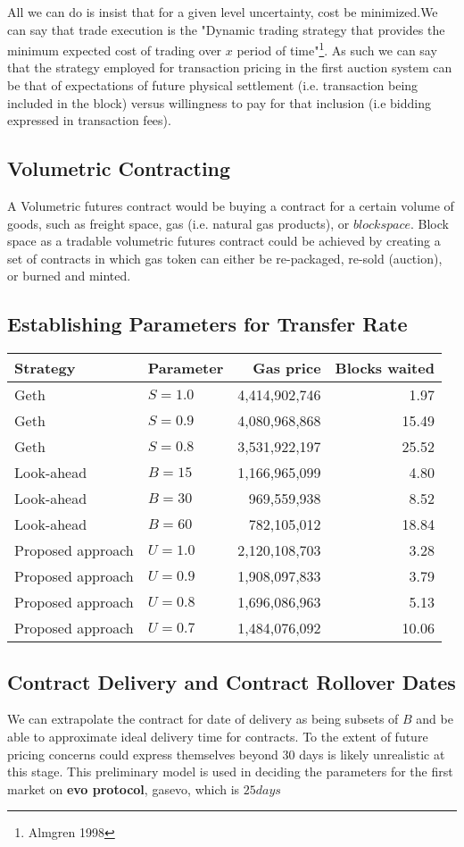 \newline

All we can do is insist that for a given level uncertainty, cost be minimized.We can say that trade execution is the "Dynamic trading
strategy that provides the minimum expected cost of trading over $x$
period of time"\footnote{Almgren 1998}. As such we can say that the
strategy employed for transaction pricing in the first auction system
can be that of expectations of future physical settlement (i.e.
transaction being included in the block) versus willingness to pay for
that inclusion (i.e bidding expressed in transaction fees).

\subsection{Volumetric Contracting}

A Volumetric futures contract would be buying a contract for a certain
volume of goods, such as freight space, gas (i.e. natural gas
products), or $block space$. Block space as a tradable volumetric
futures contract could be achieved by creating a set of contracts in
which gas token can either be re-packaged, re-sold (auction), or burned and minted.

\subsection{Establishing Parameters for Transfer Rate}

\begin{tabular}{llrr}
\hline Strategy & Parameter & Gas price & Blocks waited \\
\hline Geth & \(S =1.0\) & 4,414,902,746 & 1.97 \\
Geth & \(S =0.9\) & 4,080,968,868 & 15.49 \\
Geth & \(S =0.8\) & 3,531,922,197 & 25.52 \\
\hline Look-ahead & \(B =15\) & 1,166,965,099 & 4.80 \\
Look-ahead & \(B =30\) & 969,559,938 & 8.52 \\
Look-ahead & \(B =60\) & 782,105,012 & 18.84 \\
\hline Proposed approach & \(U =1.0\) & 2,120,108,703 & 3.28 \\
Proposed approach & \(U =0.9\) & 1,908,097,833 & 3.79 \\
Proposed approach & \(U =0.8\) & 1,696,086,963 & 5.13 \\
Proposed approach & \(U =0.7\) & 1,484,076,092 & 10.06
\end{tabular}
\newline
\subsection{Contract Delivery and Contract Rollover Dates}

We can extrapolate the contract for date of delivery as being subsets
of $B$ and be able to approximate ideal delivery time for
contracts. To the extent of future pricing concerns could express
themselves beyond 30 days is likely unrealistic at this stage. 
This preliminary model is used in deciding the parameters for the first market on \textbf{evo protocol}, gasevo, which is $25 days$
